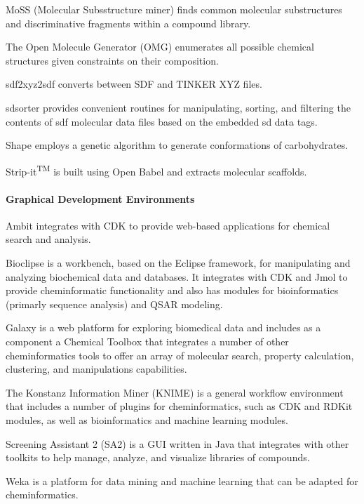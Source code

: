 MoSS (Molecular Subsstructure miner) \cite{Borgelt_2005} finds common molecular substructures and discriminative fragments within a compound library.

The Open Molecule Generator (OMG) \cite{Peironcely_2012} enumerates all possible chemical structures given constraints on their composition.

sdf2xyz2sdf  \cite{Tosco_2011} converts between SDF and TINKER XYZ files.

sdsorter provides convenient routines for manipulating, sorting, and filtering the contents of sdf molecular data files based on the embedded sd data tags.

Shape \cite{Rosen_2009} employs a genetic algorithm to generate conformations of carbohydrates.

Strip-it\textsuperscript{TM} is built using Open Babel and extracts molecular scaffolds. 


\paragraph{Graphical Development Environments}

Ambit \cite{Jeliazkova_2011} integrates with CDK to provide web-based applications for chemical search and analysis.

Bioclipse  \cite{Spjuth_2009} is a workbench, based on the Eclipse framework, for manipulating and analyzing biochemical data and databases. It integrates with CDK and Jmol to provide cheminformatic functionality and also has modules for bioinformatics (primarly sequence analysis) and QSAR modeling.

Galaxy \cite{Goecks_2010} is a web platform for exploring biomedical data and includes as a component a Chemical Toolbox that integrates a number of other cheminformatics tools to offer an array of molecular search, property calculation, clustering, and manipulations capabilities.

The Konstanz Information Miner (KNIME) is a general workflow environment that includes a number of plugins for cheminformatics, such as CDK \cite{Beisken_2013} and RDKit modules, as well as bioinformatics and machine learning modules.

Screening Assistant 2 (SA2) \cite{Guilloux_2012} is a GUI written in Java that integrates with other toolkits to help manage, analyze, and visualize libraries of compounds.

Weka \cite{Hall_2009} is a platform for data mining and machine learning that can be adapted for cheminformatics.  
